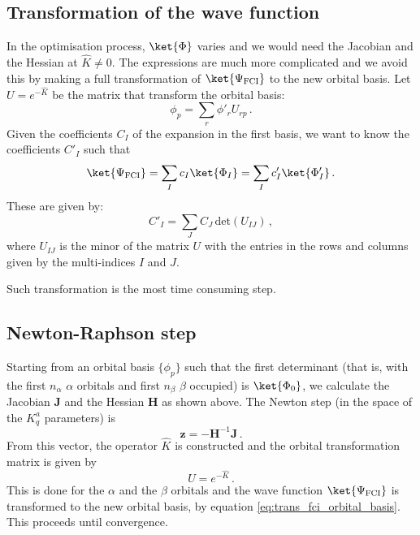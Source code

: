 \documentclass[a4paper,11pt]{article}
\begin{document}
\subsection{Transformation of the wave function}
In the optimisation process, $\ket{\Phi}$ varies and we would need the Jacobian and the Hessian at $\hat{K} \ne 0$.
The expressions are much more complicated and we avoid this by making a full transformation of $\ket{\Psi_\text{FCI}}$ to the new orbital basis.
Let $U = e^{-\hat{K}}$ be the matrix that transform the orbital basis:
\begin{equation}
  \phi_p = \sum_r \phi'_r U_{rp}\,.
\end{equation}
Given the coefficients $C_I$ of the expansion in the first basis, we want to know the coefficients $C'_I$ such that
\begin{equation}
  \ket{\Psi_\text{FCI}} = \sum_I c_I \ket{\Phi_I} = \sum_I c'_I \ket{\Phi'_I}\,.
\end{equation}
These are given by:
\begin{equation}\label{eq:trans_fci_orbital_basis}
  C'_I = \sum_J C_J\, \text{det}(U_{IJ})\,,
\end{equation}
where $U_{IJ}$ is the minor of the matrix $U$ with the entries in the rows and columns given by the multi-indices $I$ and $J$.

Such transformation is the most time consuming step.


\subsection{Newton-Raphson step}
Starting from an orbital basis $\{\phi_p\}$ such that the first determinant (that is, with the first $n_\alpha$ $\alpha$ orbitals and first $n_\beta$ $\beta$ occupied) is $\ket{\Phi_0}$, we calculate the Jacobian $\mathbf{J}$ and the Hessian $\mathbf{H}$ as shown above.
The Newton step (in the space of the $K_q^a$ parameters) is
\begin{equation}
  \mathbf{z} = -\mathbf{H}^{-1} \mathbf{J}\,.
\end{equation}
From this vector, the operator $\hat{K}$ is constructed and the orbital transformation matrix is given by
\begin{equation}
  U = e^{-\hat{K}}\,.
\end{equation}
This is done for the $\alpha$ and the $\beta$ orbitals and the wave function $\ket{\Psi_\text{FCI}}$ is transformed to the new orbital basis, by equation \ref{eq:trans_fci_orbital_basis}.
This proceeds until convergence.
\end{document}
